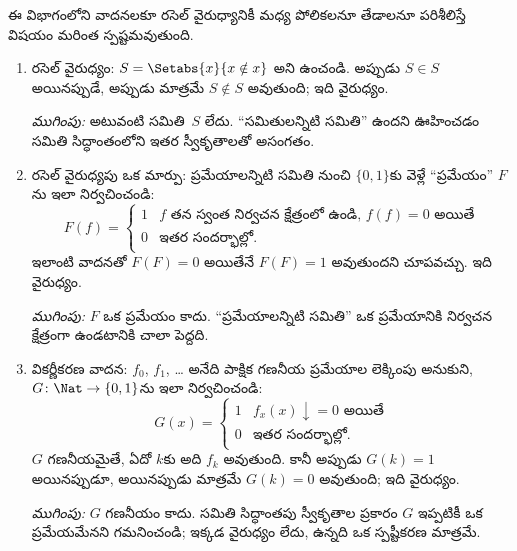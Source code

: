\documentclass[../../../include/open-logic-section]{subfiles}
\begin{document}

ఈ విభాగంలోని వాదనలకూ రసెల్ వైరుధ్యానికీ మధ్య పోలికలనూ తేడాలనూ
పరిశీలిస్తే విషయం మరింత స్పష్టమవుతుంది.
\begin{enumerate}
\item రసెల్ వైరుధ్యం: $S=\Setabs{x}{x\notin x}$ అని ఉంచండి. అప్పుడు
  $S\in S$ అయినప్పుడే, అప్పుడు మాత్రమే $S\notin S$ అవుతుంది; ఇది వైరుధ్యం.

  \emph{ముగింపు:} అటువంటి సమితి~$S$ లేదు. ``సమితులన్నిటి సమితి''
  ఉందని ఊహించడం సమితి సిద్ధాంతంలోని ఇతర స్వీకృతాలతో అసంగతం.

\item రసెల్ వైరుధ్యపు ఒక మార్పు: ప్రమేయాలన్నిటి సమితి నుంచి
  $\{0,1\}$కు వెళ్లే ``ప్రమేయం'' $F$ను ఇలా నిర్వచించండి:
  \[
  F(f)=
  \begin{cases}
    1 & \text{$f$ తన స్వంత నిర్వచన క్షేత్రంలో ఉండి, $f(f)=0$ అయితే} \\
    0 & \text{ఇతర సందర్భాల్లో.}
  \end{cases}
  \]
  ఇలాంటి వాదనతో $F(F)=0$ అయితేనే $F(F)=1$ అవుతుందని చూపవచ్చు.
  ఇది వైరుధ్యం.

  \emph{ముగింపు:} $F$ ఒక ప్రమేయం కాదు. ``ప్రమేయాలన్నిటి సమితి'' ఒక
  ప్రమేయానికి నిర్వచన క్షేత్రంగా ఉండటానికి చాలా పెద్దది.

\item వికర్ణీకరణ వాదన: $f_0$, $f_1$, \dots{} అనేది పాక్షిక గణనీయ
  ప్రమేయాల లెక్కింపు అనుకుని, $G\colon\Nat\to\{0,1\}$ను ఇలా
  నిర్వచించండి:
  \[
  G(x)=
  \begin{cases}
    1 & \text{$f_x(x)\downarrow=0$ అయితే} \\
    0 & \text{ఇతర సందర్భాల్లో.}
  \end{cases}
  \]
  $G$ గణనీయమైతే, ఏదో $k$కు అది $f_k$ అవుతుంది. కానీ అప్పుడు
  $G(k)=1$ అయినప్పుడూ, అయినప్పుడు మాత్రమే $G(k)=0$ అవుతుంది; ఇది వైరుధ్యం.

  \emph{ముగింపు:} $G$ గణనీయం కాదు. సమితి సిద్ధాంతపు స్వీకృతాల
  ప్రకారం $G$ ఇప్పటికీ ఒక ప్రమేయమేనని గమనించండి; ఇక్కడ వైరుధ్యం లేదు,
  ఉన్నది ఒక స్పష్టీకరణ మాత్రమే.
\end{enumerate}
\end{document}
